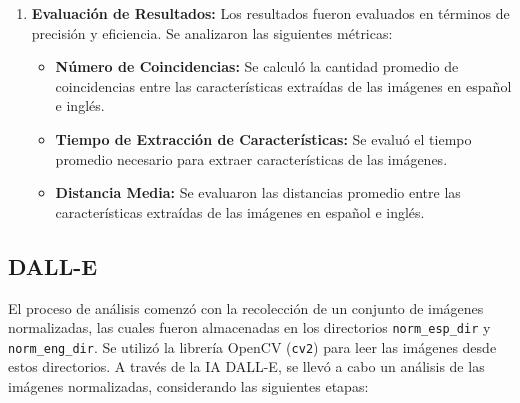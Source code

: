 \documentclass[unnumsec,webpdf,modern,large]{mam-authoring-template}
\theoremstyle{thmstyleone}%
\theoremstyle{thmstyletwo}%
\theoremstyle{thmstylethree}%
\begin{document}
\begin{enumerate}
    \item \textbf{Evaluación de Resultados:} Los resultados fueron evaluados en términos de precisión y eficiencia. Se analizaron las siguientes métricas:
    \begin{itemize}
        \item \textbf{Número de Coincidencias:} Se calculó la cantidad promedio de coincidencias entre las características extraídas de las imágenes en español e inglés.
        \item \textbf{Tiempo de Extracción de Características:} Se evaluó el tiempo promedio necesario para extraer características de las imágenes.
        \item \textbf{Distancia Media:} Se evaluaron las distancias promedio entre las características extraídas de las imágenes en español e inglés.
    \end{itemize}
\end{enumerate}

\subsection{DALL-E}
El proceso de análisis comenzó con la recolección de un conjunto de imágenes normalizadas, las cuales fueron almacenadas en los directorios \texttt{norm\_esp\_dir} y \texttt{norm\_eng\_dir}. Se utilizó la librería OpenCV (\texttt{cv2}) para leer las imágenes desde estos directorios. A través de la IA DALL-E, se llevó a cabo un análisis de las imágenes normalizadas, considerando las siguientes etapas:
\end{document}

